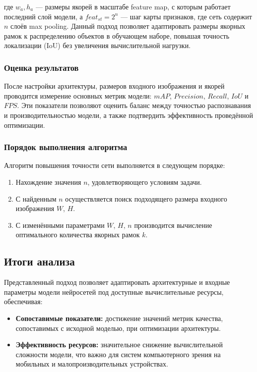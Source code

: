 \documentclass[a4paper,12pt]{article}
\begin{document}
где $w_a, h_a$ — размеры якорей в масштабе feature map, с которым работает последний слой модели,  
а $feat_{st} = 2^n$ — шаг карты признаков, где сеть содержит $n$ слоёв max pooling.  
Данный подход позволяет адаптировать размеры якорных рамок к распределению объектов в обучающем наборе, повышая точность локализации (IoU) без увеличения вычислительной нагрузки.

\subsubsection*{Оценка результатов}
После настройки архитектуры, размеров входного изображения и якорей проводится измерение основных метрик модели: $mAP$, $Precision$, $Recall$, $IoU$ и $FPS$.  
Эти показатели позволяют оценить баланс между точностью распознавания и производительностью модели, а также подтвердить эффективность проведённой оптимизации.

\subsubsection*{Порядок выполнения алгоритма}
Алгоритм повышения точности сети выполняется в следующем порядке:

\begin{enumerate}
    \item Нахождение значения $n$, удовлетворяющего условиям задачи.
    \item С найденным $n$ осуществляется поиск подходящего размера входного изображения $W$, $H$.
    \item С изменёнными параметрами $W$, $H$, $n$ производится вычисление оптимального количества якорных рамок $k$.
\end{enumerate}

\subsection{Итоги анализа}
Представленный подход позволяет адаптировать архитектурные и входные параметры модели нейросетей под доступные вычислительные ресурсы, обеспечивая:  

\begin{itemize}
    \item \textbf{Сопоставимые показатели:} достижение значений метрик качества, сопоставимых с исходной моделью, при оптимизации архитектуры.
    \item \textbf{Эффективность ресурсов:} значительное снижение вычислительной сложности модели, что важно для систем компьютерного зрения на мобильных и малопроизводительных устройствах.
\end{itemize}
\end{document}
